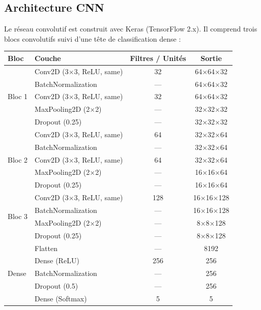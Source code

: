 \documentclass[12pt, a4paper]{article}
\begin{document}
\subsection{Architecture CNN}

Le réseau convolutif est construit avec Keras (TensorFlow 2.x). Il comprend
trois blocs convolutifs suivi d'une tête de classification dense :

\begin{center}
\begin{tabular}{@{}llcc@{}}
  \toprule
  \textbf{Bloc} & \textbf{Couche} & \textbf{Filtres / Unités} & \textbf{Sortie} \\
  \midrule
  \multirow{5}{*}{Bloc 1}
    & Conv2D (3\(\times\)3, ReLU, same) & 32 & 64\(\times\)64\(\times\)32 \\
    & BatchNormalization & --- & 64\(\times\)64\(\times\)32 \\
    & Conv2D (3\(\times\)3, ReLU, same) & 32 & 64\(\times\)64\(\times\)32 \\
    & MaxPooling2D (2\(\times\)2)        & --- & 32\(\times\)32\(\times\)32 \\
    & Dropout (0.25)                    & --- & 32\(\times\)32\(\times\)32 \\
  \midrule
  \multirow{5}{*}{Bloc 2}
    & Conv2D (3\(\times\)3, ReLU, same) & 64 & 32\(\times\)32\(\times\)64 \\
    & BatchNormalization & --- & 32\(\times\)32\(\times\)64 \\
    & Conv2D (3\(\times\)3, ReLU, same) & 64 & 32\(\times\)32\(\times\)64 \\
    & MaxPooling2D (2\(\times\)2)        & --- & 16\(\times\)16\(\times\)64 \\
    & Dropout (0.25)                    & --- & 16\(\times\)16\(\times\)64 \\
  \midrule
  \multirow{4}{*}{Bloc 3}
    & Conv2D (3\(\times\)3, ReLU, same) & 128 & 16\(\times\)16\(\times\)128 \\
    & BatchNormalization & --- & 16\(\times\)16\(\times\)128 \\
    & MaxPooling2D (2\(\times\)2)        & --- & 8\(\times\)8\(\times\)128 \\
    & Dropout (0.25)                    & --- & 8\(\times\)8\(\times\)128 \\
  \midrule
  \multirow{5}{*}{Dense}
    & Flatten & --- & 8192 \\
    & Dense (ReLU) & 256 & 256 \\
    & BatchNormalization & --- & 256 \\
    & Dropout (0.5) & --- & 256 \\
    & Dense (Softmax) & 5 & 5 \\
  \bottomrule
\end{tabular}
\end{center}
\end{document}
